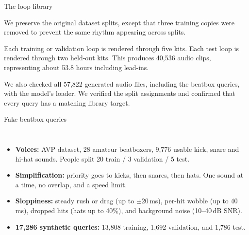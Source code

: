 \begin{frame}{The loop library}
{    We preserve the original dataset splits, except that
    three training copies were removed to prevent the same
    rhythm appearing across splits.

    Each training or validation loop is rendered through
    five kits. Each test loop is rendered through two
    held-out kits. This produces 40,536 audio clips,
    representing about 53.8 hours including lead-ins.

    We also checked all 57,822 generated audio files,
    including the beatbox queries, with the model's loader.
    We verified the split assignments and confirmed that
    every query has a matching library target.
  }
\end{frame}

\begin{frame}{Fake beatbox queries}

  \begin{columns}[T,onlytextwidth]
      \small
      \begin{itemize}
        \item \textbf{Voices:} AVP dataset, 28 amateur
          beatboxers, 9,776 usable kick, snare and hi-hat sounds.
          People split 20 train / 3 validation / 5 test.

        \item \textbf{Simplification:} priority goes to kicks,
          then snares, then hats. One sound at a time,
          no overlap, and a speed limit.

        \item \textbf{Sloppiness:} steady rush or drag
          (up to $\pm$20\,ms), per-hit wobble (up to 40\,ms),
          dropped hits (hats up to 40\%), and background
          noise (10--40\,dB SNR).

        \item \textbf{17,286 synthetic queries:}
          13,808 training, 1,692 validation, and 1,786 test.
      \end{itemize}

  \end{columns}

\end{frame}

